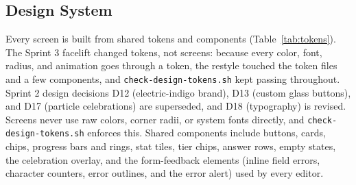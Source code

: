 \documentclass[12pt,letterpaper]{article}
\begin{document}
\subsection{Design System}
Every screen is built from shared tokens and components (Table~\ref{tab:tokens}).
The Sprint 3 facelift changed tokens, not screens: because every color, font, radius,
and animation goes through a token, the restyle touched the token files and a few
components, and \texttt{check-design-tokens.sh} kept passing throughout. Sprint 2
design decisions D12 (electric-indigo brand), D13 (custom glass buttons), and D17
(particle celebrations) are superseded, and D18 (typography) is revised.
Screens never use raw colors, corner radii, or system fonts directly, and
\texttt{check-design-tokens.sh} enforces this. Shared components include buttons, cards,
chips, progress bars and rings, stat tiles, tier chips, answer rows, empty states, the
celebration overlay, and the form-feedback elements (inline field errors, character
counters, error outlines, and the error alert) used by every editor.
\end{document}
